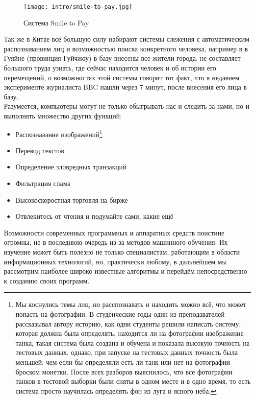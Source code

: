\begin{figure}[H]
    \centering
    \texttt{[image: intro/smile-to-pay.jpg]}
    \caption{Система Smile to Pay} %
\end{figure}

Так же в Китае всё большую силу набирают системы слежения с автоматическим распознаванием лиц и возможностью поиска конкретного человека, например в в Гуяйне (провинция Гуйчжоу) в базу внесены все жители города, не составляет большого труда узнать, где сейчас находится человек и об истории его перемещений, о возможностях этой системы говорит тот факт, что в недавнем эксперименте журналиста BBC нашли через 7 минут, после внесения его лица в базу\cite{china-face-recognition}.\\

Разумеется, компьютеры могут не только обыгрывать нас и следить за нами, но и выполнять множество других функций:\\
\begin{itemize}
    \item Распознавание изображений\footnote{Мы коснулись темы лиц, но расспознавать и находить можно всё, что может попасть на фотографии. В студенческие годы один из преподавателей рассказывал автору историю, как одни студенты решили написать систему, которая должна была определять, находится ли на фотографии изображение танка, такая система была создана и обучена и показала высокую точность на тестовых данных, однако, при запуске на тестовых данных точность была меньшей, чем если бы определяли есть ли танк или нет на фотографии броском монетки. После всех разборов выяснилось, что все фотографии танков в тестовой выборки были сняты в одном месте и в одно время, то есть система просто научилась определять фон из луга и ясного неба.}
    \item Перевод текстов
    \item Определение зловредных транзакций
    \item Фильтрация спама
    \item Высокоскоростная торговля на бирже
    \item Отвлекитесь от чтения и подумайте сами, какие ещё\\
\end{itemize}

Возможности современных программных и аппаратных средств поистине огромны, не в последнюю очередь из-за методов машинного обучения. Их изучение может быть полезно не только специалистам, работающим в области информационных технологий, но, практически любому, в дальнейшем мы рассмотрим наиболее широко известные алгоритмы и перейдём непосредственно к созданию своих программ.







